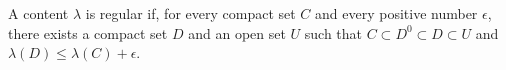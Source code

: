 A content $\lambda$ is regular if, for every compact set $C$ and every positive number $\epsilon$, there exists a compact set $D$ and an open set $U$ such that $C \subset D^0 \subset D \subset U$ and $\lambda(D) \leq \lambda(C) + \epsilon$.

